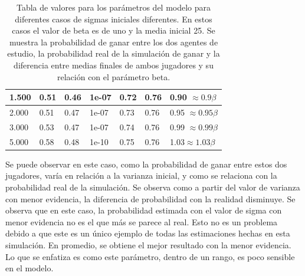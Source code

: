 \documentclass[11pt,twoside,spanish]{report} %
\begin{document}
\begin{table}[H]
{\begin{tabular}{|l|l|l|l|l|l|l|}
1.500                                   & 0.51                                   & 0.46                                     & 1e-07                                  & 0.72                                                 & 0.76                                            & 0.90 $ \approx 0.9\beta$                      \\ \hline
2.000                                   & 0.51                                    & 0.47                                    & 1e-07                                  & 0.73                                                 & 0.76                                            & 0.95 $ \approx 0.95\beta$                     \\ \hline
3.000                                   & 0.53                                    & 0.47                                     & 1e-07                                  & 0.74                                                 & 0.76                                            & 0.99 $ \approx 0.99\beta$                     \\ \hline
5.000                                   & 0.58                                   & 0.48                                     & 1e-10                                  & 0.75                                                 & 0.76                                            & 1.03$ \approx 1.03\beta$                      \\ \hline
\end{tabular}%
}
\caption{Tabla de valores para los par\'ametros del modelo para diferentes casos de sigmas iniciales diferentes. En estos casos el valor de beta es de uno y la media inicial 25. Se muestra la probabilidad de ganar entre los dos agentes de estudio, la probabilidad real de la simulaci\'on de ganar y la diferencia entre medias finales de ambos jugadores y su relaci\'on con el par\'ametro beta.}
\label{tab:sigma}
\end{table}

%


Se puede observar en este caso, como la probabilidad de ganar entre estos dos jugadores, var\'ia en relaci\'on a la varianza inicial, y como se relaciona con la probabilidad real de la simulaci\'on.
Se observa como a partir del valor de varianza con menor evidencia, la diferencia de probabilidad con la realidad disminuye.
Se observa que en este caso, la probabilidad estimada con el valor de sigma con menor evidencia no es el que m\'as se parece al real.
Esto no es un problema debido a que este es un \'unico ejemplo de todas las estimaciones hechas en esta simulaci\'on.
En promedio, se obtiene el mejor resultado con la menor evidencia.
Lo que se enfatiza es como este par\'ametro, dentro de un rango, es poco sensible en el modelo.
\end{document}
